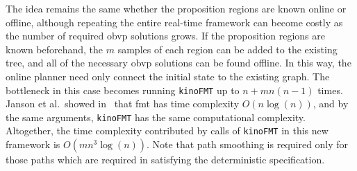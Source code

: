 The idea remains the same whether the proposition regions are known online or offline, although repeating the entire real-time framework can become costly as the number of required \gls{obvp} solutions grows. If the proposition regions are known beforehand, the $m$ samples of each region can be added to the existing tree, and all of the necessary \gls{obvp} solutions can be found offline. In this way, the online planner need only connect the initial state to the existing graph. The bottleneck in this case becomes running \texttt{kinoFMT} up to $n+mn(n-1)$ times. Janson et al.\ showed in~\cite{Janson2015} that \gls{fmt} has time complexity $O(n\log(n))$, and by the same arguments, \texttt{kinoFMT} has the same computational complexity. Altogether, the time complexity contributed by calls of \texttt{kinoFMT} in this new framework is $O(mn^3 \log(n))$. Note that path smoothing is required only for those paths which are required in satisfying the deterministic \mucalc{} specification.



